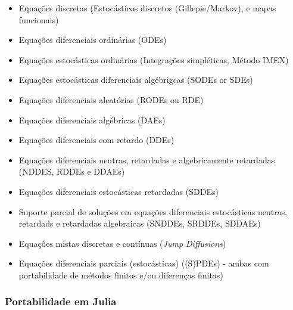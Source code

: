 \documentclass[
12pt,				%
openright,			%
oneside,			%
a4paper,			%
english,			%
french,				%
spanish,			%
brazil,				%
]{abntex2}
\begin{document}
\begin{itemize}
\item Equações discretas (Estocásticos discretos (Gillepie/Markov), e mapas funcionais)
\item Equações diferenciais ordinárias (ODEs)
\item Equações estocásticas ordinárias (Integrações simpléticas, Método IMEX)
\item Equações estocásticas diferenciais algébrigcas (SODEs or SDEs)
\item Equações diferenciais aleatórias (RODEs ou RDE)
\item Equações diferenciais algébricas (DAEs)
\item Equações diferenciais com retardo (DDEs)
\item Equações diferenciais neutras, retardadas e algebricamente retardadas (NDDES, RDDEs e DDAEs)
\item Equações diferenciais estocásticas retardadas (SDDEs)
\item Suporte parcial de soluções em equações diferenciais estocásticas neutras, retardads e retardadas algebraicas (SNDDEs, SRDDEs, SDDAEs)
\item Equações mistas discretas e contínuas (\textit{Jump Diffusions})
\item Equações diferenciais parciais (estocásticas) ((S)PDEs) - ambas com portabilidade de métodos finitos e/ou diferenças finitas)
\end{itemize}



\subsubsection{Portabilidade em Julia}
\end{document}

